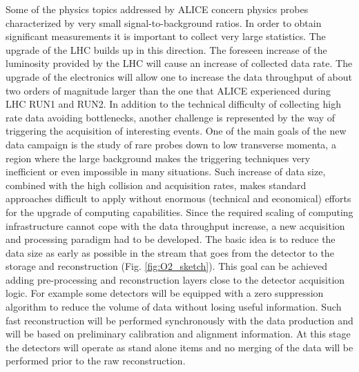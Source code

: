 Some of the physics topics addressed by ALICE concern physics probes characterized by very small signal-to-background ratios.
In order to obtain significant measurements it is important to collect very large statistics.
The upgrade of the LHC builds up in this direction.
The foreseen increase of the luminosity provided by the LHC will cause an increase of collected data rate.
The upgrade of the electronics will allow one to increase the data throughput of about two orders of magnitude larger than the one that ALICE experienced during LHC RUN1 and RUN2.
In addition to the technical difficulty of collecting high rate data avoiding bottlenecks, another challenge is represented by the way of triggering the acquisition of interesting events.
One of the main goals of the new data campaign is the study of rare probes down to low transverse momenta, a region where the large background makes the triggering techniques very inefficient or even impossible in many situations.
Such increase of data size, combined with the high collision and acquisition rates, makes standard approaches difficult to apply without enormous (technical and economical) efforts for the upgrade of computing capabilities.
Since the required scaling of computing infrastructure cannot cope with the data throughput increase, a new acquisition and processing paradigm had to be developed.
The basic idea is to reduce the data size as early as possible in the stream that goes from the detector to the storage and reconstruction (Fig. \ref{fig:O2_sketch}).
This goal can be achieved adding pre-processing and reconstruction layers close to the detector acquisition logic.
For example some detectors will be equipped with a zero suppression algorithm to reduce the volume of data without losing useful information.
Such fast reconstruction will be performed synchronously with the data production and will be based on preliminary calibration and alignment information.
At this stage the detectors will operate as stand alone items and no merging of the data will be performed prior to the raw reconstruction.

